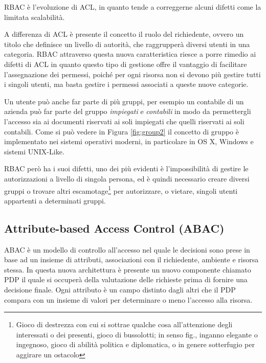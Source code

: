 RBAC è l'evoluzione di ACL, in quanto tende a correggerne alcuni difetti come la limitata scalabilità. \par
A differenza di \ac{ACL} è presente il concetto il ruolo del richiedente, ovvero un titolo che definisce un livello di autorità, che raggrupperà diversi utenti in una categoria. 
\ac{RBAC} attraverso questa nuova caratteristica riesce a porre rimedio ai difetti di \ac{ACL} in quanto
questo tipo di gestione offre il vantaggio di facilitare l'assegnazione dei permessi, poiché per ogni risorsa non si devono più gestire tutti i singoli utenti, ma basta gestire i permessi associati a queste nuove categorie. 


Un utente può anche far parte di più gruppi, per esempio un contabile di un azienda può far parte del gruppo \textit{impiegati} e \textit{contabili} in modo da permettergli l'accesso sia ai documenti riservati ai soli impiegati che quelli riservati ai soli contabili.
Come si può vedere in Figura \ref{fig:group2} il concetto di gruppo è implementato nei sistemi operativi moderni, in particolare in OS X, Windows e sistemi UNIX-Like.

\ac{RBAC} però ha i suoi difetti, uno dei più evidenti è l'impossibilità di gestire le autorizzazioni a livello di singola persona, ed è quindi necessario creare diversi gruppi o trovare altri escamotage\footnote{Gioco di destrezza con cui si sottrae qualche cosa all’attenzione degli interessati o dei presenti, gioco di bussolotti; in senso fig., inganno elegante o ingegnoso, gioco di abilità politica e diplomatica, o in genere sotterfugio per aggirare un ostacolo} per autorizzare, o vietare, singoli utenti appartenti a determinati gruppi.


\subsection*{Attribute-based Access Control (ABAC)} %
\label{sub:attribute_based_access_control_}

\ac{ABAC} è un modello di controllo all'accesso  nel quale le decisioni sono prese in base ad un insieme 
di attributi, associazioni con il richiedente, ambiente e risorsa stessa.
In questa nuova architettura è presente un nuovo componente chiamato \ac{PDP} il quale si occuperà della valutazione delle richieste prima di fornire una decisione finale.
Ogni attributo è un campo distinto dagli altri che il \ac{PDP} compara con un insieme di valori per determinare o meno l'accesso alla risorsa. 


